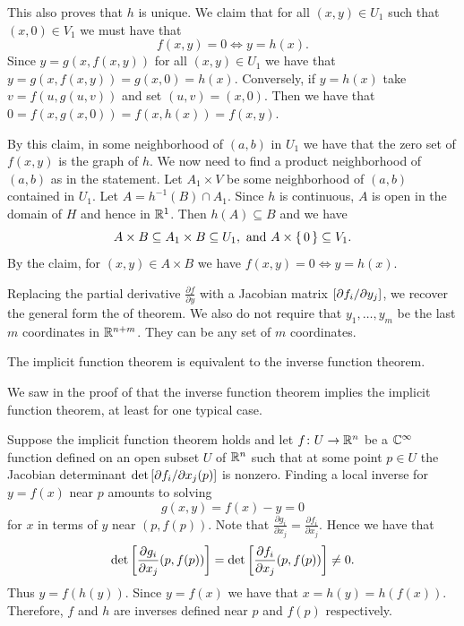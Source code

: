 \documentclass[letterpaper, 11pt, oneside]{book}
\begin{document}
\begin{pf}
  This also proves that $h$ is unique.
  We claim that for all $(x, y) \in U_{1}$ such that $(x, 0) \in V_{1}$ we must have that
  \[
    f(x, y) = 0 \iff y = h(x).
  \]
  Since $y = g(x, f(x, y))$ for all $(x, y) \in U_{1}$ we have that $y = g(x, f(x, y)) = g(x, 0) = h(x)$.
  Conversely, if $y = h(x)$ take $v = f(u, g(u, v))$ and set $(u, v) = (x, 0)$.
  Then we have that $0 = f(x, g(x, 0)) = f(x, h(x)) = f(x, y)$.

  By this claim, in some neighborhood of $(a, b)$ in $U_{1}$ we have that the zero set of $f(x, y)$ is the graph of $h$.
  We now need to find a product neighborhood of $(a, b)$ as in the statement.
  Let $A_{1} \times V$ be some neighborhood of $(a, b)$ contained in $U_{1}$.
  Let $A = h^{-1}(B) \cap A_{1}$.
  Since $h$ is continuous, $A$ is open in the domain of $H$ and hence in $\mathbb{R}^{1}$.
  Then $h(A) \subseteq B$ and we have
  \[
    A \times B \subseteq A_{1} \times B \subseteq U_{1}, \text{ and } A \times \set{0} \subseteq V_{1}.
  \]
  By the claim, for $(x, y) \in A \times B$ we have $f(x, y) = 0 \iff y = h(x)$.

  Replacing the partial derivative $\frac{\partial f}{\partial y}$ with a Jacobian matrix $\bqty{\partial f_{i} / \partial y_{j}}$, we recover the general form the of theorem.
  We also do not require that $y_{1}, \ldots, y_{m}$ be the last $m$ coordinates in $\mathbb{R}^{n + m}$.
  They can be any set of $m$ coordinates.
\end{pf}

\clearpage

\begin{thrm}
  The implicit function theorem is equivalent to the inverse function theorem.
\end{thrm}
\begin{pf}
  We saw in the proof of  that the inverse function theorem implies the implicit function theorem, at least for one typical case.

  Suppose the implicit function theorem holds and let $f\colon U \to \mathbb{R}^{n}$ be a $\mathbb{C}^{\infty}$ function defined on an open subset $U$ of $\mathbb{R}^{n}$ such that at some point $p \in U$ the Jacobian determinant $\det\bqty{\partial f_{i} / \partial x_{j}(p)}$ is nonzero.
  Finding a local inverse for $y = f(x)$ near $p$ amounts to solving
  \[
    g(x, y) = f(x) - y = 0
  \]
  for $x$ in terms of $y$ near $(p, f(p))$.
  Note that $\frac{\partial g_{i}}{\partial x_{j}} = \frac{\partial f_{i}}{\partial x_{j}}$.
  Hence we have that
  \[
    \det\bqty{\frac{\partial g_{i}}{\partial x_{j}} (p, f(p))} = \det\bqty{\frac{\partial f_{i}}{\partial x_{j}}(p, f(p))} \neq 0.
  \]
  Thus $y = f(h(y))$.
  Since $y = f(x)$ we have that $x = h(y) = h(f(x))$.
  Therefore, $f$ and $h$ are inverses defined near $p$ and $f(p)$ respectively.
\end{pf}
\end{document}
